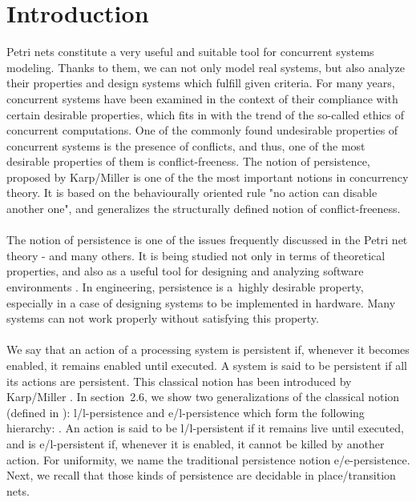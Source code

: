 \documentclass[a4paper]{llncs}
\begin{document}
\section{Introduction}

Petri nets constitute a very useful and suitable tool for concurrent systems modeling. Thanks to them, we can not only model real systems, but also analyze their properties and design systems which fulfill given criteria. For many years, concurrent systems have been examined in the context of their compliance with certain desirable properties, which fits in with the trend of the so-called ethics of concurrent computations. One of the commonly found undesirable properties of concurrent systems is the presence of conflicts, and thus, one of the most desirable properties of them is conflict-freeness. The notion of persistence, proposed by Karp/Miller \cite{KarpMiller} is one of the the most important notions in concurrency theory. It is based on the behaviourally oriented rule "no action can disable another one", and generalizes the structurally defined notion of conflict-freeness.
\\ \\
The notion of persistence is one of the issues frequently discussed in the Petri net theory - \cite{BestDar,Grabowski,Hack,LandRob,Mayr,Koutny} and many others. It is being studied not only in terms of theoretical properties, and also as a useful tool for designing and analyzing software environments \cite{BestEsparza}. In engineering, persistence is a~highly desirable property, especially in a case of designing systems to be implemented in hardware. Many systems can not work properly without satisfying this property.
\\ \\
We say that an action of a processing system is persistent if, whenever it becomes enabled, it remains enabled until executed. A system is said to be persistent if all its actions are persistent. This classical notion has been introduced by Karp/Miller \cite{KarpMiller}. In section~2.6, we show two generalizations of the classical notion (defined in \cite{BarOch}): l/l-persistence and e/l-persistence which form the following hierarchy: . An action is said to be l/l-persistent if it remains live until executed, and is e/l-persistent if, whenever it is enabled, it cannot be killed by another action. For uniformity, we name the traditional persistence notion e/e-persistence. Next, we recall that those kinds of persistence are decidable in place/transition nets.
\\ \\
\end{document}
